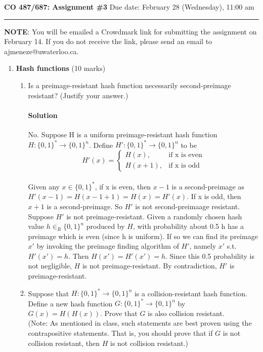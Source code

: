 \documentclass[11pt]{article}
\begin{document}
\noindent
{\large\bf CO 487/687: Assignment \#3} \hfill Due date: February 28 (Wednesday),
11:00 am

\hfill\hrule

\vspace*{2mm}
\noindent
{\bf NOTE}: You will be emailed a Crowdmark link for submitting the
assignment on February 14. If you do not receive the link, please
send an email to ajmeneze@uwaterloo.ca.

\begin{enumerate}

\item {\bf Hash functions} (10 marks)
\begin{enumerate}
\item Is a preimage-resistant hash function necessarily second-preimage
resistant? (Justify your answer.)
\paragraph{Solution} No. Suppose H is a uniform preimage-resistant hash function $H:\{0,1\}^* \to \{0,1\}^n$. Define $H':\{0,1\}^* \to \{0,1\}^n$ to be \\
\[ H'(x)=
\begin{cases}
H(x), & \text{if x is even}\\
H(x+1), & \text{if x is odd}
\end{cases}
\]\\
Given any $x\in \{0,1\}^*$, if x is even, then $x-1$ is a second-preimage as $H'(x-1)=H(x-1+1)=H(x)=H'(x)$. If x is odd, then $x+1$ is a second-preimage. So $H'$ is not second-preimaage resistant.\\
Suppose $H'$ is not preimage-resistant. Given a randomly chosen hash value $h\in_R\{0,1\}^n$ produced by $H$, with probability about 0.5 h has a preimage which is even (since h is uniform). If so we can find its preimage $x'$ by invoking the preimage finding algorithm of $H'$, namely $x'$ s.t. $H'(x')=h$. Then $H(x')=H'(x')=h$. Since this 0.5 probability is not negligible, $H$ is not preimage-resistant. By contradiction, $H'$ is preimage-resistant.

\item Suppose that $H: \{0,1\}^* \rightarrow \{0,1\}^n$ is a collision-resistant
hash function. Define a new hash function $G : \{0,1\}^* \rightarrow
\{0,1\}^n$ by $G(x) = H(H(x))$. Prove that $G$ is also collision resistant.\\
(Note: As mentioned in class, such statements are best proven using the
contrapositive statements. That is, you should prove that if $G$ is not
collision resistant, then $H$ is not collision resistant.)

\end{enumerate}
\end{enumerate}
\end{document}
